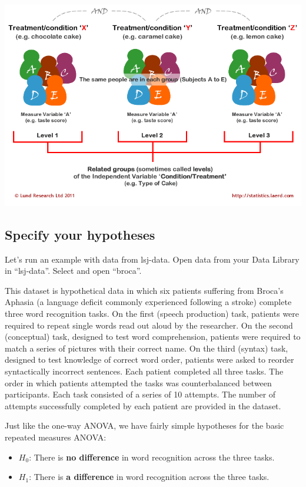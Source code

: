 \documentclass[
]{book}
\providecommand{\tightlist}{%
  \setlength{\itemsep}{0pt}\setlength{\parskip}{0pt}}
\begin{document}
\includegraphics{images/05-repeated-measures-anova/Laerd2.png}

\hypertarget{specify-your-hypotheses-5}{%
\subsection{Specify your hypotheses}\label{specify-your-hypotheses-5}}

Let's run an example with data from lsj-data. Open data from your Data Library in ``lsj-data''. Select and open ``broca''.

This dataset is hypothetical data in which six patients suffering from Broca's Aphasia (a language deficit commonly experienced following a stroke) complete three word recognition tasks. On the first (speech production) task, patients were required to repeat single words read out aloud by the researcher. On the second (conceptual) task, designed to test word comprehension, patients were required to match a series of pictures with their correct name. On the third (syntax) task, designed to test knowledge of correct word order, patients were asked to reorder syntactically incorrect sentences. Each patient completed all three tasks. The order in which patients attempted the tasks was counterbalanced between participants. Each task consisted of a series of 10 attempts. The number of attempts successfully completed by each patient are provided in the dataset.

Just like the one-way ANOVA, we have fairly simple hypotheses for the basic repeated measures ANOVA:

\begin{itemize}
\tightlist
\item
  \(H_0\): There is \textbf{no difference} in word recognition across the three tasks.
\item
  \(H_1\): There is \textbf{a difference} in word recognition across the three tasks.
\end{itemize}
\end{document}
